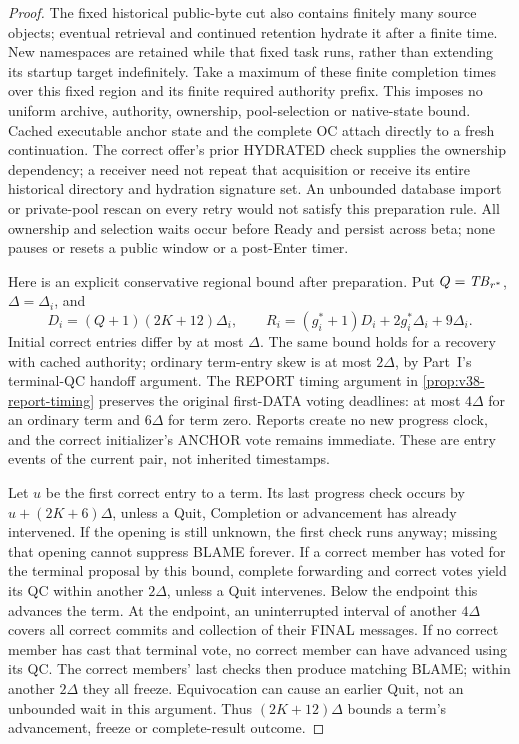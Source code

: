 \begin{proof}
The fixed historical public-byte cut also contains finitely many source
objects; eventual retrieval and continued retention hydrate it after a
finite time. New namespaces are retained while that fixed task runs,
rather than extending its startup target indefinitely. Take a maximum
of these finite completion times over this fixed region and its finite
required authority prefix. This imposes no uniform archive, authority,
ownership, pool-selection or native-state bound. Cached executable
anchor state and the complete OC attach directly to a fresh
continuation. The correct offer's prior HYDRATED check supplies the
ownership dependency; a receiver need not repeat that acquisition or
receive its entire historical directory and hydration signature set. An unbounded database import or private-pool
rescan on every retry would not satisfy this preparation rule. All
ownership and selection waits occur before Ready and persist across
beta; none pauses or resets a public window or a post-Enter timer.

Here is an explicit conservative regional bound after preparation.
Put $Q=\mathit{TB}_{r^*}$, $\Delta=\Delta_i$, and
\[
 D_i=(Q+1)(2K+12)\Delta_i,\qquad
 R_i=(g_i^*+1)D_i+2g_i^*\Delta_i+9\Delta_i.
\]
Initial correct entries differ by at most $\Delta$. The same bound
holds for a recovery with cached authority; ordinary term-entry skew
is at most $2\Delta$, by Part~I's terminal-QC handoff argument. The
REPORT timing argument in \cref{prop:v38-report-timing} preserves the original
first-DATA voting deadlines: at most $4\Delta$ for an ordinary term and
$6\Delta$ for term zero. Reports create no new progress clock, and the
correct initializer's ANCHOR vote remains immediate. These are entry
events of the current pair, not inherited timestamps.

Let $u$ be the first correct entry to a term. Its last progress check
occurs by $u+(2K+6)\Delta$, unless a Quit, Completion or advancement
has already intervened. If the opening is still unknown, the first
check runs anyway; missing that opening cannot suppress BLAME forever.
If a correct member has voted for the terminal proposal by this bound,
complete forwarding and correct votes yield its QC within another
$2\Delta$, unless a Quit intervenes. Below the endpoint this advances
the term. At the endpoint, an uninterrupted interval of another
$4\Delta$ covers all correct commits and collection of their FINAL
messages. If no correct member has cast that terminal vote, no correct
member can have advanced using its QC. The correct members' last
checks then produce matching BLAME; within another $2\Delta$ they all
freeze. Equivocation can cause an earlier Quit, not an unbounded wait
in this argument. Thus $(2K+12)\Delta$ bounds a term's advancement,
freeze or complete-result outcome.


\end{proof}
